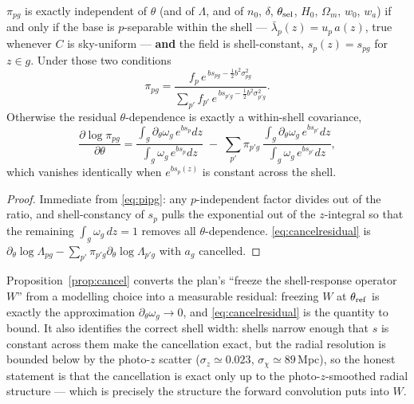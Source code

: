 \begin{proposition}
\label{prop:cancel}
$\pi_{pg}$ is exactly independent of $\theta$ (and of $\Lambda$, and of $n_0$,
$\delta$, $\theta_{\rm sel}$, $H_0$, $\Omega_{m}$, $w_0$, $w_a$) if and only if
the base is $p$-separable within the shell --- $\bar\lambda_{p}(z)=u_p\,a(z)$,
true whenever $C$ is sky-uniform --- \textbf{and} the field is shell-constant,
$s_p(z)=s_{pg}$ for $z\in g$.  Under those two conditions
\begin{equation}
  \pi_{pg}=\frac{f_p\,e^{\,b s_{pg}-\frac12 b^2\sigma_{pg}^2}}
                {\sum_{p'}f_{p'}\,e^{\,b s_{p'g}-\frac12 b^2\sigma_{p'g}^2}} .
  \label{eq:pi-exact}
\end{equation}
Otherwise the residual $\theta$-dependence is exactly a within-shell covariance,
\begin{equation}
  \frac{\partial\log\pi_{pg}}{\partial\theta}
  =\frac{\displaystyle\int_g \partial_\theta\omega_g\,e^{b s_p}dz}
        {\displaystyle\int_g \omega_g\,e^{b s_p}dz}
  \;-\;\sum_{p'}\pi_{p'g}\,
  \frac{\displaystyle\int_g \partial_\theta\omega_g\,e^{b s_{p'}}dz}
       {\displaystyle\int_g \omega_g\,e^{b s_{p'}}dz},
  \label{eq:cancelresidual}
\end{equation}
which vanishes identically when $e^{bs_p(z)}$ is constant across the shell.
\end{proposition}
\begin{proof}
Immediate from \eqref{eq:pipg}: any $p$-independent factor divides out of the
ratio, and shell-constancy of $s_p$ pulls the exponential out of the
$z$-integral so that the remaining $\int_g\omega_g\,dz=1$ removes all
$\theta$-dependence.  \eqref{eq:cancelresidual} is
$\partial_\theta\log\Lambda_{pg}-\sum_{p'}\pi_{p'g}\partial_\theta\log\Lambda_{p'g}$
with $a_g$ cancelled.
\end{proof}

\begin{remark}
Proposition~\ref{prop:cancel} converts the plan's ``freeze the shell-response
operator $W$'' from a modelling choice into a measurable residual: freezing $W$
at $\theta_{\rm ref}$ is exactly the approximation
$\partial_\theta\omega_g\to0$, and \eqref{eq:cancelresidual} is the quantity to
bound.  It also identifies the correct shell width: shells narrow enough that
$s$ is constant across them make the cancellation exact, but the radial
resolution is bounded below by the photo-$z$ scatter
($\sigma_z\simeq0.023$, $\sigma_\chi\simeq89$\,Mpc), so the honest statement is
that the cancellation is exact only up to the photo-$z$-smoothed radial
structure --- which is precisely the structure the forward convolution puts
into $W$.
\end{remark}

